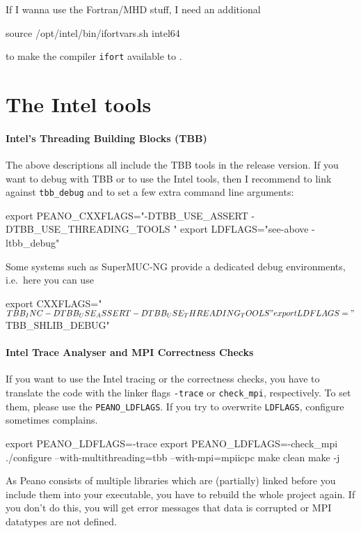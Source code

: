 If I wanna use the Fortran/MHD stuff, I need an additional
\begin{code}
source /opt/intel/bin/ifortvars.sh intel64
\end{code}
to make the compiler \texttt{ifort} available to \Peano.


\section{The Intel tools}
\label{section:supercomputers:IntelTools}

\paragraph{Intel's Threading Building Blocks (TBB)}

The above descriptions all include the TBB tools in the release version.
If you want to debug with TBB or to use the Intel tools, then I recommend to
link against \texttt{tbb\_debug} and to set a few extra command line arguments:

\begin{code}
 export PEANO_CXXFLAGS="-DTBB_USE_ASSERT -DTBB_USE_THREADING_TOOLS "
 export LDFLAGS="see-above   -ltbb_debug"
\end{code}

\noindent
Some systems such as SuperMUC-NG provide a dedicated debug environments,
i.e.~here you can use
\begin{code}
 export CXXFLAGS="$TBB_INC -DTBB_USE_ASSERT -DTBB_USE_THREADING_TOOLS "
 export LDFLAGS="$TBB_SHLIB_DEBUG"
\end{code}


\paragraph{Intel Trace Analyser and MPI Correctness Checks}

If you want to use the Intel tracing or the correctness checks, you have to
translate the code with the linker flags \texttt{-trace} or \texttt{check\_mpi},
respectively.
To set them, please use the \texttt{PEANO\_LDFLAGS}.
If you try to overwrite \texttt{LDFLAGS}, configure sometimes complains.


\begin{code}
 export PEANO_LDFLAGS=-trace
 export PEANO_LDFLAGS=-check_mpi
 ./configure --with-multithreading=tbb --with-mpi=mpiicpc
 make clean
 make -j
\end{code}


\noindent
As Peano consists of multiple libraries which are (partially) linked before you
include them into your executable, you have to rebuild the whole project again.
If you don't do this, you will get error messages that data is corrupted or MPI
datatypes are not defined.



